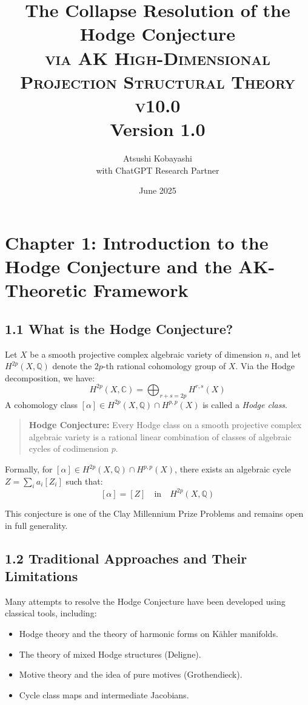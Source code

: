 \documentclass[11pt]{article}
\title{The Collapse Resolution of the Hodge Conjecture \\ 
\Large \textsc{via AK High-Dimensional Projection Structural Theory v10.0} \\
\small Version 1.0}
\author{Atsushi Kobayashi \\ \small with ChatGPT Research Partner}
\date{June 2025}
\begin{document}
\maketitle
\tableofcontents
\newpage


\section{Chapter 1: Introduction to the Hodge Conjecture and the AK-Theoretic Framework}

\subsection{1.1 What is the Hodge Conjecture?}

Let $X$ be a smooth projective complex algebraic variety of dimension $n$, and let $H^{2p}(X, \mathbb{Q})$ denote the $2p$-th rational cohomology group of $X$.  
Via the Hodge decomposition, we have:
\[
H^{2p}(X, \mathbb{C}) = \bigoplus_{r+s=2p} H^{r,s}(X)
\]
A cohomology class $[\alpha] \in H^{2p}(X, \mathbb{Q}) \cap H^{p,p}(X)$ is called a \emph{Hodge class}.

\begin{quote}
\textbf{Hodge Conjecture:}  
Every Hodge class on a smooth projective complex algebraic variety is a rational linear combination of classes of algebraic cycles of codimension $p$.
\end{quote}

Formally, for $[\alpha] \in H^{2p}(X, \mathbb{Q}) \cap H^{p,p}(X)$, there exists an algebraic cycle $Z = \sum_i a_i [Z_i]$ such that:
\[
[\alpha] = [Z] \quad \text{in} \quad H^{2p}(X, \mathbb{Q})
\]

This conjecture is one of the Clay Millennium Prize Problems and remains open in full generality.

\subsection{1.2 Traditional Approaches and Their Limitations}

Many attempts to resolve the Hodge Conjecture have been developed using classical tools, including:

\begin{itemize}
  \item Hodge theory and the theory of harmonic forms on Kähler manifolds.
  \item The theory of mixed Hodge structures (Deligne).
  \item Motive theory and the idea of pure motives (Grothendieck).
  \item Cycle class maps and intermediate Jacobians.
\end{itemize}
\end{document}
